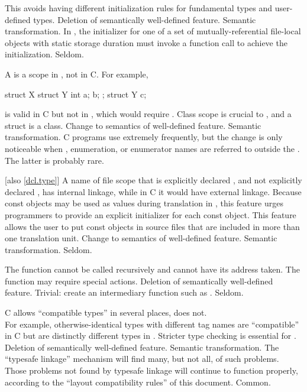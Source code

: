 \rationale
This avoids having different initialization rules for
fundamental types and user-defined types.
\effect
Deletion of semantically well-defined feature.
\difficulty
Semantic transformation.
In \Cpp{}, the initializer for one of a set of
mutually-referential file-local objects with static storage
duration must invoke a function
call to achieve the initialization.
\howwide
Seldom.

\change
A  is a scope in \Cpp{}, not in C.
For example,
\begin{codeblock}
struct X {
  struct Y { int a; } b;
};
struct Y c;
\end{codeblock}
is valid in C but not in \Cpp{}, which would require .
\rationale
Class scope is crucial to \Cpp{}, and a struct is a class.
\effect
Change to semantics of well-defined feature.
\difficulty
Semantic transformation.
\howwide
C programs use  extremely frequently, but the
change is only noticeable when , enumeration, or enumerator
names are referred to outside the .
The latter is probably rare.

 [also \ref{dcl.type}]
\change
A name of file scope that is explicitly declared , and not explicitly
declared , has internal linkage, while in C it would have external linkage.
\rationale
Because const objects may be used as values during translation in
\Cpp{}, this feature urges programmers to provide an explicit initializer
for each const object.
This feature allows the user to put const objects in source files that are included
in more than one translation unit.
\effect
Change to semantics of well-defined feature.
\difficulty
Semantic transformation.
\howwide
Seldom.

\change
The  function cannot be called recursively and cannot have its address taken.
\rationale
The  function may require special actions.
\effect
Deletion of semantically well-defined feature.
\difficulty
Trivial: create an intermediary function such as
.
\howwide
Seldom.

\change
C allows ``compatible types'' in several places, \Cpp{} does not.\\
For example,
otherwise-identical  types with different tag names
are ``compatible'' in C but are distinctly different types
in \Cpp{}.
\rationale
Stricter type checking is essential for \Cpp{}.
\effect
Deletion of semantically well-defined feature.
\difficulty
Semantic transformation.
The ``typesafe linkage'' mechanism will find many, but not all,
of such problems.
Those problems not found by typesafe linkage will continue to
function properly,
according to the ``layout compatibility rules'' of this
document.
\howwide
Common.

